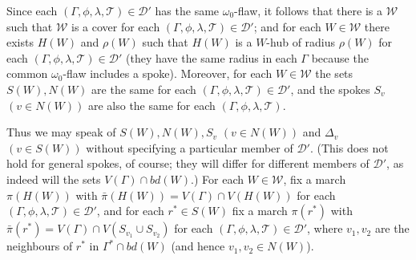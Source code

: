 Since each $(\Gamma, \phi, \lambda, \mathscr{T}) \in \mathscr{D}'$ has the same $\omega_0$-flaw, it follows that there is a $\mathscr{W}$ such that $\mathscr{W}$ is a cover for each $(\Gamma, \phi, \lambda, \mathscr{T}) \in \mathscr{D}'$; and for each $W \in \mathscr{W}$ there exists $H(W)$ and $\rho(W)$ such that $H(W)$ is a $W$-hub of radius $\rho(W)$ for each $(\Gamma, \phi, \lambda, \mathscr{T}) \in \mathscr{D}'$ (they have the same radius in each $\Gamma$ because the common $\omega_0$-flaw includes a spoke). Moreover, for each $W \in \mathscr{W}$ the sets $S(W), N(W)$ are the same for each $(\Gamma, \phi, \lambda, \mathscr{T}) \in \mathscr{D}'$, and the spokes $S_v$ $(v \in N(W))$ are also the same for each $(\Gamma, \phi, \lambda, \mathscr{T})$.

Thus we may speak of $S(W), N(W), S_v$ $(v \in N(W))$ and $\Delta_v$ $(v \in S(W))$ without specifying a particular member of $\mathscr{D}'$. (This does not hold for general spokes, of course; they will differ for different members of $\mathscr{D}'$, as indeed will the sets $V(\Gamma) \cap bd(W)$.) For each $W \in \mathscr{W}$, fix a march $\pi(H(W))$ with $\bar{\pi}(H(W)) = V(\Gamma) \cap V(H(W))$ for each $(\Gamma, \phi, \lambda, \mathscr{T}) \in \mathscr{D}'$, and for each $r^* \in S(W)$ fix a march $\pi(r^*)$ with $\bar{\pi}(r^*) = V(\Gamma) \cap V(S_{v_1} \cup S_{v_2})$ for each $(\Gamma, \phi, \lambda, \mathscr{T}) \in \mathscr{D}'$, where $v_1, v_2$ are the neighbours of $r^*$ in $\Gamma^* \cap bd(W)$ (and hence $v_1, v_2 \in N(W)$).


